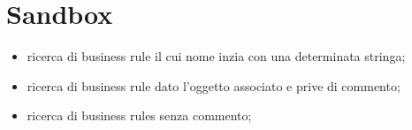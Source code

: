 \chapter{Sandbox}
\begin{itemize}
\item ricerca di business rule il cui nome inzia con una determinata stringa; 
\item ricerca di business rule dato l'oggetto associato e prive di commento;
\item ricerca di business rules senza commento;
\end{itemize}


